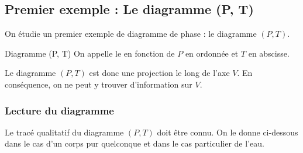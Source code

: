 \documentclass[a4paper,french,bookmarks]{article}
\begin{document}
\subsection{Premier exemple : Le diagramme (P, T)}

On étudie un premier exemple de diagramme de phase : le diagramme $(P, T)$.

\begin{definition}{Diagramme (P, T)}{}
    On appelle  le  en fonction de $P$ en ordonnée et $T$ en abscisse.
\end{definition}

Le diagramme $(P, T)$ est donc une projection le long de l'axe $V$. En conséquence, on ne peut y trouver d'information sur $V$.

\subsubsection{Lecture du diagramme}

Le tracé qualitatif du diagramme $(P, T)$ doit être connu. On le donne ci-dessous dans le cas d'un corps pur quelconque et dans le cas particulier de l'eau.\medskip
\end{document}
